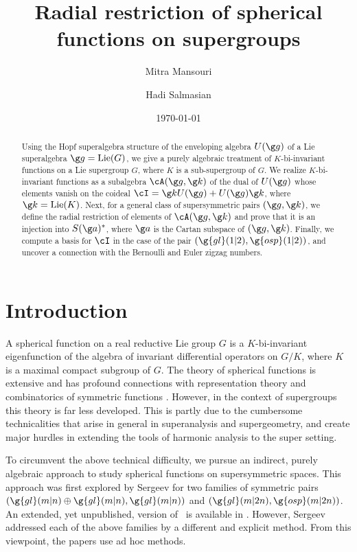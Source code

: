 \documentclass[11pt]{amsart}
\title{Radial restriction of spherical functions on supergroups}
\author{Mitra Mansouri \and Hadi Salmasian}
\date{\today}
\begin{document}
\begin{abstract}
Using the Hopf superalgebra structure of the enveloping algebra $U(\g g)$ of a Lie superalgebra $\g g=\mathrm{Lie}(G)$, we  give a purely algebraic treatment of $K$-bi-invariant functions on a Lie supergroup $G$, where $K$ is a sub-supergroup of $G$. 
We realize $K$-bi-invariant functions as a  subalgebra $\cA(\g g,\g k)$ of the dual of $U(\g g)$ whose elements vanish on the coideal $\cI=\g kU(\g g)+U(\g g)\g k$, where $\g k=\mathrm{Lie}(K)$.  
Next, for a general class of supersymmetric pairs $(\g g,\g k)$, we define the radial restriction of elements of $\cA(\g g,\g k)$ and  prove that it is an injection into $S(\g a)^*$, where $\g a$ is the Cartan subspace of $(\g g,\g k)$.  
Finally, we compute a basis for $\cI$ in the case of the pair
$(\g{gl}(1|2), \g{osp}(1|2))$, and uncover a connection with the Bernoulli and Euler zigzag numbers. 



\end{abstract}

\maketitle

\section{Introduction}

A spherical function on a real reductive Lie group $G$ is a  $K$-bi-invariant
eigenfunction of the algebra of invariant differential operators on $G/K$, where $K$ is a maximal compact subgroup of $G$. The theory of spherical functions is extensive and has profound connections with  representation theory and combinatorics of symmetric functions \cite{helgason2022groups,Macdonald,Gangolli}. 
However, in the context of  supergroups this theory is far less developed. This is partly due to the cumbersome technicalities that arise in general in superanalysis and supergeometry, and create  major hurdles in extending the  tools of harmonic analysis to the super setting. 

To circumvent the above technical difficulty, we pursue an indirect, purely algebraic approach to study spherical functions on supersymmetric spaces.  This approach was first explored by Sergeev \cite{sergeev2001superanalogs} for two families of symmetric pairs $(\g{gl}(m|n)\oplus \g{gl}(m|n),\g{gl}(m|n))$ and $(\g{gl}(m|2n),\g{osp}(m|2n))$. 
An extended, yet unpublished, version of~\cite{ sergeev2001superanalogs}
is available in 
\cite{SergeevPreprint}.
However, Sergeev addressed each of the above families by a different and explicit method. From this viewpoint, the papers   
\cite{sergeev2001superanalogs,SergeevPreprint} use ad hoc methods.
\end{document}
